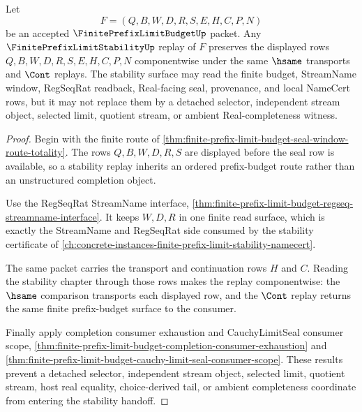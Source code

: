 \begin{theorem}
\label{thm:finite-prefix-limit-budget-stability-handoff}
Let
$$
F=(Q,B,W,D,R,S,E,H,C,P,N)
$$
be an accepted $\FinitePrefixLimitBudgetUp$ packet. Any $\FinitePrefixLimitStabilityUp$ replay of $F$ preserves the displayed rows $Q,B,W,D,R,S,E,H,C,P,N$ componentwise under the same $\hsame$ transports and $\Cont$ replays. The stability surface may read the finite budget, StreamName window, RegSeqRat readback, Real-facing seal, provenance, and local NameCert rows, but it may not replace them by a detached selector, independent stream object, selected limit, quotient stream, or ambient Real-completeness witness.
\end{theorem}
\begin{proof}
Begin with the finite route of \autoref{thm:finite-prefix-limit-budget-seal-window-route-totality}. The rows $Q,B,W,D,R,S$ are displayed before the seal row is available, so a stability replay inherits an ordered prefix-budget route rather than an unstructured completion object.

Use the RegSeqRat StreamName interface, \autoref{thm:finite-prefix-limit-budget-regseq-streamname-interface}. It keeps $W,D,R$ in one finite read surface, which is exactly the StreamName and RegSeqRat side consumed by the stability certificate of \autoref{ch:concrete-instances-finite-prefix-limit-stability-namecert}.

The same packet carries the transport and continuation rows $H$ and $C$. Reading the stability chapter through those rows makes the replay componentwise: the $\hsame$ comparison transports each displayed row, and the $\Cont$ replay returns the same finite prefix-budget surface to the consumer.

Finally apply completion consumer exhaustion and CauchyLimitSeal consumer scope, \autoref{thm:finite-prefix-limit-budget-completion-consumer-exhaustion} and \autoref{thm:finite-prefix-limit-budget-cauchy-limit-seal-consumer-scope}. These results prevent a detached selector, independent stream object, selected limit, quotient stream, host real equality, choice-derived tail, or ambient completeness coordinate from entering the stability handoff.
\end{proof}

